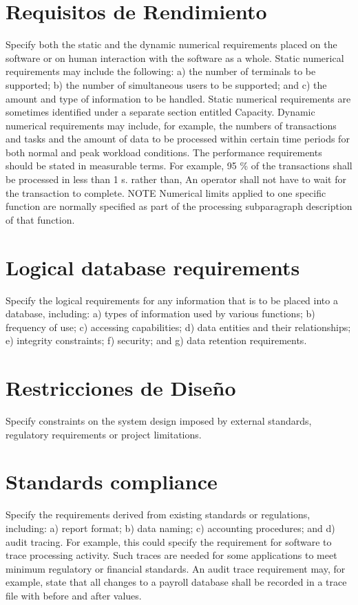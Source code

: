 \documentclass[12pt, a4paper, twoside]{article}
\begin{document}
 \section{Requisitos de Rendimiento}
 Specify both the static and the dynamic numerical requirements placed on the software or on human
 interaction with the software as a whole.
 Static numerical requirements may include the following:
 a) the number of terminals to be supported;
 b) the number of simultaneous users to be supported; and
 c) the amount and type of information to be handled.
 Static numerical requirements are sometimes identified under a separate section entitled Capacity.
 Dynamic numerical requirements may include, for example, the numbers of transactions and tasks and
 the amount of data to be processed within certain time periods for both normal and peak workload
 conditions.
 The performance requirements should be stated in measurable terms.
 For example,
 95 \% of the transactions shall be processed in less than 1 s.
 rather than,
 An operator shall not have to wait for the transaction to complete.
 NOTE Numerical limits applied to one specific function are normally specified as part of the processing
 subparagraph description of that function.

 \section{Logical database requirements}
 Specify the logical requirements for any information that is to be placed into a database, including:
 a) types of information used by various functions;
 b) frequency of use;
 c) accessing capabilities;
 d) data entities and their relationships;
 e) integrity constraints;
 f) security; and
 g) data retention requirements.

 \section{Restricciones de Diseño}
 Specify constraints on the system design imposed by external standards, regulatory requirements or
 project limitations.

 \section{Standards compliance}
 Specify the requirements derived from existing standards or regulations, including:
 a) report format;
 b) data naming;
 c) accounting procedures; and
 d) audit tracing.
 For example, this could specify the requirement for software to trace processing activity. Such traces
 are needed for some applications to meet minimum regulatory or financial standards. An audit trace
 requirement may, for example, state that all changes to a payroll database shall be recorded in a trace
 file with before and after values.
\end{document}
